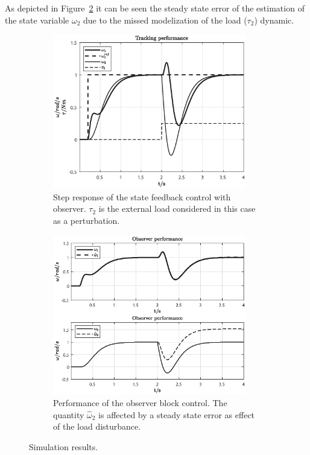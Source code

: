 \documentclass[11pt,a4paper,oneside]{book}
\numberwithin{equation}{section}
\theoremstyle{it}
\theoremstyle{definition}
\begin{document}
As depicted in Figure~\ref{figure_sim2} it can be seen the steady state error 
of the estimation of the state variable $\omega_2$ due to the missed 
modelization of the load ($\tau_2$) dynamic.
\begin{figure}[H]
	\centering
	\begin{subfigure}{.5\textwidth}
		\centering
		\includegraphics[width = 240pt, keepaspectratio]{figures/msm/track_w_1.eps}
		\captionsetup{width=0.65\textwidth, font=footnotesize}
		\caption{Step response of the state feedback control with observer. 
			$\tau_2$ is the external load considered in this case as a 
			perturbation.}
		\label{figure_sim1}
	\end{subfigure}%
	\begin{subfigure}{.5\textwidth}
		\centering
		\includegraphics[width = 240pt, keepaspectratio]{figures/msm/observer_1.eps}
		\captionsetup{width=0.65\textwidth, font=footnotesize}
		\caption{Performance of the observer block control. The quantity $\hat{\omega}_2$ is affected by a steady state error as effect of the load disturbance.}
		\label{figure_sim2}
	\end{subfigure}
	\captionsetup{width=0.65\textwidth, font=small}
	\caption{Simulation results.}
	\label{}
\end{figure}
\end{document}
